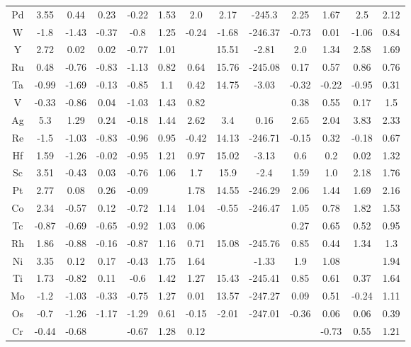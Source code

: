 \begin{center}
\begin{tabular}{| c | c | c | c | c | c | c | c | c | c | c | c | c |}
Pd & 3.55 & 0.44 & 0.23 & -0.22 & 1.53 & 2.0 & 2.17 & -245.3 & 2.25 & 1.67 & 2.5 & 2.12 \\
W & -1.8 & -1.43 & -0.37 & -0.8 & 1.25 & -0.24 & -1.68 & -246.37 & -0.73 & 0.01 & -1.06 & 0.84 \\
Y & 2.72 & 0.02 & 0.02 & -0.77 & 1.01 &  & 15.51 & -2.81 & 2.0 & 1.34 & 2.58 & 1.69 \\
Ru & 0.48 & -0.76 & -0.83 & -1.13 & 0.82 & 0.64 & 15.76 & -245.08 & 0.17 & 0.57 & 0.86 & 0.76 \\
Ta & -0.99 & -1.69 & -0.13 & -0.85 & 1.1 & 0.42 & 14.75 & -3.03 & -0.32 & -0.22 & -0.95 & 0.31 \\
V & -0.33 & -0.86 & 0.04 & -1.03 & 1.43 & 0.82 &  &  & 0.38 & 0.55 & 0.17 & 1.5 \\
Ag & 5.3 & 1.29 & 0.24 & -0.18 & 1.44 & 2.62 & 3.4 & 0.16 & 2.65 & 2.04 & 3.83 & 2.33 \\
Re & -1.5 & -1.03 & -0.83 & -0.96 & 0.95 & -0.42 & 14.13 & -246.71 & -0.15 & 0.32 & -0.18 & 0.67 \\
Hf & 1.59 & -1.26 & -0.02 & -0.95 & 1.21 & 0.97 & 15.02 & -3.13 & 0.6 & 0.2 & 0.02 & 1.32 \\
Sc & 3.51 & -0.43 & 0.03 & -0.76 & 1.06 & 1.7 & 15.9 & -2.4 & 1.59 & 1.0 & 2.18 & 1.76 \\
Pt & 2.77 & 0.08 & 0.26 & -0.09 &  & 1.78 & 14.55 & -246.29 & 2.06 & 1.44 & 1.69 & 2.16 \\
Co & 2.34 & -0.57 & 0.12 & -0.72 & 1.14 & 1.04 & -0.55 & -246.47 & 1.05 & 0.78 & 1.82 & 1.53 \\
Tc & -0.87 & -0.69 & -0.65 & -0.92 & 1.03 & 0.06 &  &  & 0.27 & 0.65 & 0.52 & 0.95 \\
Rh & 1.86 & -0.88 & -0.16 & -0.87 & 1.16 & 0.71 & 15.08 & -245.76 & 0.85 & 0.44 & 1.34 & 1.3 \\
Ni & 3.35 & 0.12 & 0.17 & -0.43 & 1.75 & 1.64 &  & -1.33 & 1.9 & 1.08 &  & 1.94 \\
Ti & 1.73 & -0.82 & 0.11 & -0.6 & 1.42 & 1.27 & 15.43 & -245.41 & 0.85 & 0.61 & 0.37 & 1.64 \\
Mo & -1.2 & -1.03 & -0.33 & -0.75 & 1.27 & 0.01 & 13.57 & -247.27 & 0.09 & 0.51 & -0.24 & 1.11 \\
Os & -0.7 & -1.26 & -1.17 & -1.29 & 0.61 & -0.15 & -2.01 & -247.01 & -0.36 & 0.06 & 0.06 & 0.39 \\
Cr & -0.44 & -0.68 &  & -0.67 & 1.28 & 0.12 &  &  &  & -0.73 & 0.55 & 1.21 \\

\end{tabular}
\end{center}
